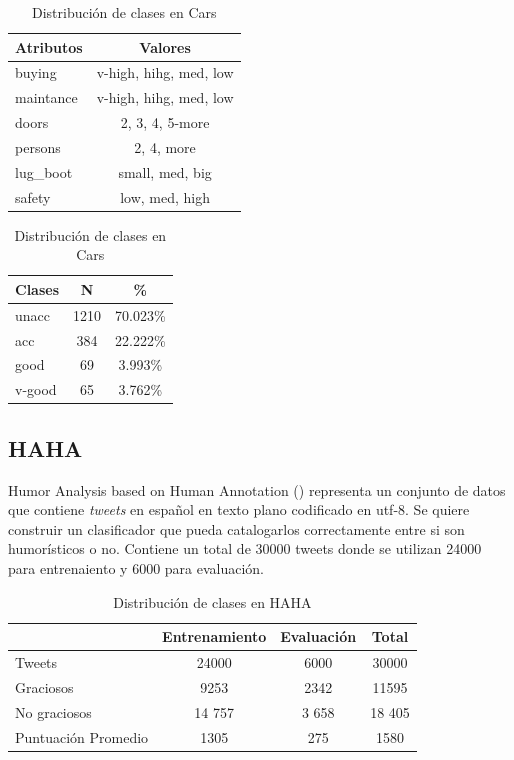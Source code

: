 \begin{table}[ht]
    \centering
    \parbox{.45\linewidth}{
    \begin{tabular} { |l|c| }
        \hline
        Atributos & Valores \\
        \hline
        \hline
        buying & v-high, hihg, med, low \\
        \hline
        maintance &  v-high, hihg, med, low\\
        \hline
        doors & 2, 3, 4, 5-more\\
        \hline
        persons & 2, 4, more\\
        \hline
        lug\_boot & small, med, big\\
        \hline
        safety & low, med, high\\
        \hline
    \end{tabular}
    \caption{Tipos de Atributos en Cars}
    \label{implementation:table:cars:attributes}
    }
    \qquad
    \parbox[t]{.45\linewidth}{
    \begin{tabular} {|l|c|c|}
        \hline
        Clases & N & \% \\
        \hline
        \hline
        unacc & 1210 & 70.023\%\\
        \hline
        acc & 384 & 22.222\%\\
        \hline
        good & 69 & 3.993\%\\
        \hline
        v-good & 65 & 3.762\%\\
        \hline
    \end{tabular}
    \caption{Distribuci\'on de clases en Cars}
    \label{implementation:table:cars:classes}
    }
\end{table}

\subsection{HAHA}
Humor Analysis based on Human Annotation (\cite{chiruzzo2019overview}) representa un conjunto de datos que contiene \textit{tweets} en espa\~nol en texto plano codificado en utf-8. Se quiere construir un clasificador que pueda catalogarlos correctamente entre si son humor\'isticos o no. Contiene un total de 30000 tweets donde se utilizan 24000 para entrenaiento y 6000 para evaluaci\'on.

\begin{table}[ht]
    \centering
    \begin{tabular} {|l||c|c|c|}
        \hline
        & Entrenamiento & Evaluaci\'on & Total \\
        \hline
        \hline
        Tweets & 24000 & 6000 & $30000$\\
        \hline
        Graciosos & 9253 & 2342 & 11595\\
        \hline
        No graciosos & 14 757 & 3 658 & 18 405\\
        \hline
        Puntuaci\'on Promedio & 1305 & 275 & 1580\\
        \hline
    \end{tabular}
    \caption{Distribuci\'on de clases en HAHA}
    \label{implementation:table:haha}
\end{table}

